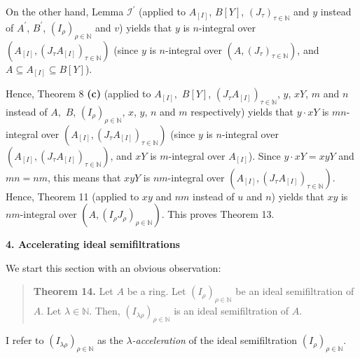 \documentclass[12pt,final,notitlepage,onecolumn]{article}%
\begin{document}
On the other hand, Lemma $\mathcal{I}^{\prime}$ (applied to $A_{\left[
I\right]  }$, $B\left[  Y\right]  $, $\left(  J_{\tau}\right)  _{\tau
\in\mathbb{N}}$ and $y$ instead of $A^{\prime}$, $B^{\prime}$, $\left(
I_{\rho}\right)  _{\rho\in\mathbb{N}}$ and $v$) yields that $y$ is
$n$-integral over $\left(  A_{\left[  I\right]  },\left(  J_{\tau}A_{\left[
I\right]  }\right)  _{\tau\in\mathbb{N}}\right)  $ (since $y$ is $n$-integral
over $\left(  A,\left(  J_{\tau}\right)  _{\tau\in\mathbb{N}}\right)  $, and
$A\subseteq A_{\left[  I\right]  }\subseteq B\left[  Y\right]  $).

Hence, Theorem 8 \textbf{(c)} (applied to $A_{\left[  I\right]  },$ $B\left[
Y\right]  $, $\left(  J_{\tau}A_{\left[  I\right]  }\right)  _{\tau
\in\mathbb{N}}$, $y$, $xY$, $m$ and $n$ instead of $A,$ $B$, $\left(  I_{\rho
}\right)  _{\rho\in\mathbb{N}}$, $x$, $y$, $n$ and $m$ respectively) yields
that $y\cdot xY$ is $mn$-integral over $\left(  A_{\left[  I\right]  },\left(
J_{\tau}A_{\left[  I\right]  }\right)  _{\tau\in\mathbb{N}}\right)  $ (since
$y$ is $n$-integral over $\left(  A_{\left[  I\right]  },\left(  J_{\tau
}A_{\left[  I\right]  }\right)  _{\tau\in\mathbb{N}}\right)  $, and $xY$ is
$m$-integral over $A_{\left[  I\right]  }$). Since $y\cdot xY=xyY$ and
$mn=nm$, this means that $xyY$ is $nm$-integral over $\left(  A_{\left[
I\right]  },\left(  J_{\tau}A_{\left[  I\right]  }\right)  _{\tau\in
\mathbb{N}}\right)  $. Hence, Theorem 11 (applied to $xy$ and $nm$ instead of
$u$ and $n$) yields that $xy$ is $nm$-integral over $\left(  A,\left(
I_{\rho}J_{\rho}\right)  _{\rho\in\mathbb{N}}\right)  $. This proves Theorem 13.

\begin{center}
\color{blue} \textbf{4. Accelerating ideal semifiltrations} \color{black}
\end{center}

We start this section with an obvious observation:

\begin{quote}
\textbf{Theorem 14.} Let $A$ be a ring. Let $\left(  I_{\rho}\right)
_{\rho\in\mathbb{N}}$ be an ideal semifiltration of $A$. Let $\lambda
\in\mathbb{N}$. Then, $\left(  I_{\lambda\rho}\right)  _{\rho\in\mathbb{N}}$
is an ideal semifiltration of $A$.
\end{quote}

I refer to $\left(  I_{\lambda\rho}\right)  _{\rho\in\mathbb{N}}$ as the
$\lambda$\textit{-acceleration} of the ideal semifiltration $\left(  I_{\rho
}\right)  _{\rho\in\mathbb{N}}$.
\end{document}
